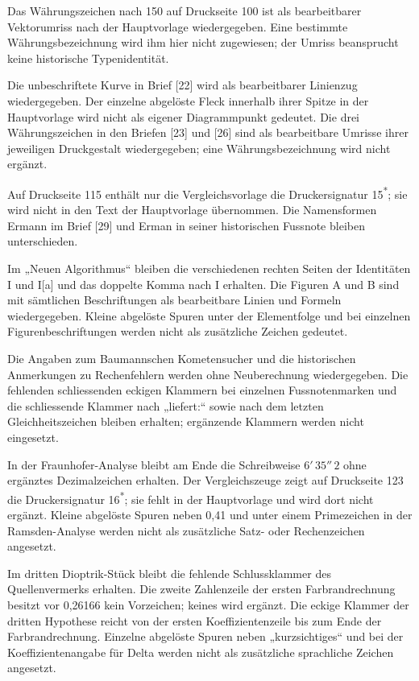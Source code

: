 Das Währungszeichen nach 150 auf Druckseite 100 ist als bearbeitbarer Vektorumriss nach der Hauptvorlage wiedergegeben. Eine bestimmte Währungsbezeichnung wird ihm hier nicht zugewiesen; der Umriss beansprucht keine historische Typenidentität.

Die unbeschriftete Kurve in Brief [22] wird als bearbeitbarer Linienzug wiedergegeben. Der einzelne abgelöste Fleck innerhalb ihrer Spitze in der Hauptvorlage wird nicht als eigener Diagrammpunkt gedeutet. Die drei Währungszeichen in den Briefen [23] und [26] sind als bearbeitbare Umrisse ihrer jeweiligen Druckgestalt wiedergegeben; eine Währungsbezeichnung wird nicht ergänzt.

Auf Druckseite 115 enthält nur die Vergleichsvorlage die Druckersignatur 15\textsuperscript{*}; sie wird nicht in den Text der Hauptvorlage übernommen. Die Namensformen Ermann im Brief [29] und Erman in seiner historischen Fussnote bleiben unterschieden.

Im „Neuen Algorithmus“ bleiben die verschiedenen rechten Seiten der Identitäten I und I[a] und das doppelte Komma nach I erhalten. Die Figuren A und B sind mit sämtlichen Beschriftungen als bearbeitbare Linien und Formeln wiedergegeben. Kleine abgelöste Spuren unter der Elementfolge und bei einzelnen Figurenbeschriftungen werden nicht als zusätzliche Zeichen gedeutet.

Die Angaben zum Baumannschen Kometensucher und die historischen Anmerkungen zu Rechenfehlern werden ohne Neuberechnung wiedergegeben. Die fehlenden schliessenden eckigen Klammern bei einzelnen Fussnotenmarken und die schliessende Klammer nach „liefert:“ sowie nach dem letzten Gleichheitszeichen bleiben erhalten; ergänzende Klammern werden nicht eingesetzt.

In der Fraunhofer-Analyse bleibt am Ende die Schreibweise $6'\,35''\,2$ ohne ergänztes Dezimalzeichen erhalten. Der Vergleichszeuge zeigt auf Druckseite 123 die Druckersignatur 16\textsuperscript{*}; sie fehlt in der Hauptvorlage und wird dort nicht ergänzt. Kleine abgelöste Spuren neben 0,41 und unter einem Primezeichen in der Ramsden-Analyse werden nicht als zusätzliche Satz- oder Rechenzeichen angesetzt.

Im dritten Dioptrik-Stück bleibt die fehlende Schlussklammer des Quellenvermerks erhalten. Die zweite Zahlenzeile der ersten Farbrandrechnung besitzt vor 0,26166 kein Vorzeichen; keines wird ergänzt. Die eckige Klammer der dritten Hypothese reicht von der ersten Koeffizientenzeile bis zum Ende der Farbrandrechnung. Einzelne abgelöste Spuren neben „kurzsichtiges“ und bei der Koeffizientenangabe für Delta werden nicht als zusätzliche sprachliche Zeichen angesetzt.


